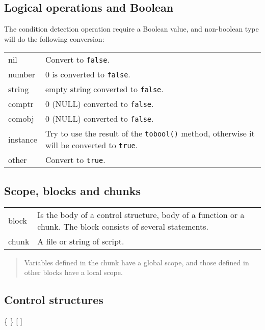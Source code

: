 \subsection*{Logical operations and Boolean}
The condition detection operation require a Boolean value, and non-boolean type will do the following conversion:\\
\begin{tabular}{lp{}}
    \textsf{nil} & Convert to \texttt{false}. \\
    \textsf{number} & 0 is converted to \texttt{false}. \\
    \textsf{string} & empty string converted to \texttt{false}. \\
    \textsf{comptr} & 0 (NULL) converted to \texttt{false}. \\
    \textsf{comobj} & 0 (NULL) converted to \texttt{false}. \\
    \textsf{instance} & Try to use the result of the \texttt{tobool()} method, otherwise it will be converted to \texttt{true}. \\
    \textsf{other} & Convert to \texttt{true}. \\
\end{tabular}


\subsection*{Scope, blocks and chunks}
\begin{tabular}{@{}lp{}}
    \textsf{block} & Is the body of a control structure, body of a function or a chunk. The block consists of several statements. \\
    \textsf{chunk} & A file or string of script. \\
\end{tabular}

\begin{quote}
    Variables defined in the chunk have a global scope, and those defined in other blocks have a local scope.
\end{quote}

\subsection*{Control structures}

\hangpar {}   \{  \} [ ] 

